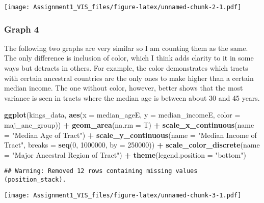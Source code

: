 \documentclass[
]{article}
\newenvironment{Shaded}{\begin{snugshade}}{\end{snugshade}}
\newcommand{\DataTypeTok}[1]{\textcolor[rgb]{0.13,0.29,0.53}{#1}}
\newcommand{\DecValTok}[1]{\textcolor[rgb]{0.00,0.00,0.81}{#1}}
\newcommand{\KeywordTok}[1]{\textcolor[rgb]{0.13,0.29,0.53}{\textbf{#1}}}
\newcommand{\NormalTok}[1]{#1}
\newcommand{\OperatorTok}[1]{\textcolor[rgb]{0.81,0.36,0.00}{\textbf{#1}}}
\newcommand{\StringTok}[1]{\textcolor[rgb]{0.31,0.60,0.02}{#1}}
\begin{document}
\texttt{[image: Assignment1\_VIS\_files/figure-latex/unnamed-chunk-2-1.pdf]}

\hypertarget{graph-4}{%
\subsubsection{Graph 4}\label{graph-4}}

The following two graphs are very similar so I am counting them as the
same. The only difference is inclusion of color, which I think adds
clarity to it in some ways but detracts in others. For example, the
color demonstrates which tracts with certain ancestral countries are the
only ones to make higher than a certain median income. The one without
color, however, better shows that the most variance is seen in tracts
where the median age is between about 30 and 45 years.

\begin{Shaded}
\begin{Highlighting}[]
\KeywordTok{ggplot}\NormalTok{(kings_data,}
       \KeywordTok{aes}\NormalTok{(}\DataTypeTok{x =}\NormalTok{ median_ageE,}
           \DataTypeTok{y =}\NormalTok{ median_incomeE,}
           \DataTypeTok{color =}\NormalTok{ maj_anc_group)) }\OperatorTok{+}
\StringTok{  }\KeywordTok{geom_area}\NormalTok{(}\DataTypeTok{na.rm =}\NormalTok{ T) }\OperatorTok{+}
\StringTok{  }\KeywordTok{scale_x_continuous}\NormalTok{(}\DataTypeTok{name =} \StringTok{"Median Age of Tract"}\NormalTok{) }\OperatorTok{+}
\StringTok{  }\KeywordTok{scale_y_continuous}\NormalTok{(}\DataTypeTok{name =} \StringTok{"Median Income of Tract"}\NormalTok{,}
                     \DataTypeTok{breaks =} \KeywordTok{seq}\NormalTok{(}\DecValTok{0}\NormalTok{, }\DecValTok{1000000}\NormalTok{, }\DataTypeTok{by =} \DecValTok{250000}\NormalTok{)) }\OperatorTok{+}
\StringTok{  }\KeywordTok{scale_color_discrete}\NormalTok{(}\DataTypeTok{name =} \StringTok{"Major Ancestral Region of Tract"}\NormalTok{) }\OperatorTok{+}
\StringTok{  }\KeywordTok{theme}\NormalTok{(}\DataTypeTok{legend.position =} \StringTok{"bottom"}\NormalTok{)}
\end{Highlighting}
\end{Shaded}

\begin{verbatim}
## Warning: Removed 12 rows containing missing values (position_stack).
\end{verbatim}

\texttt{[image: Assignment1\_VIS\_files/figure-latex/unnamed-chunk-3-1.pdf]}
\end{document}

